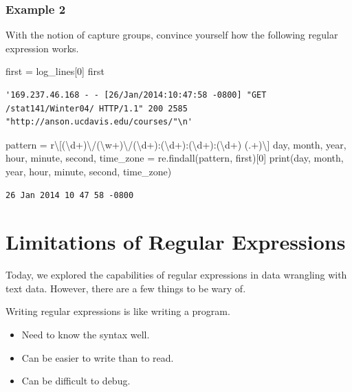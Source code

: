 \documentclass[
  letterpaper,
  DIV=11,
  numbers=noendperiod]{scrreprt}
\newenvironment{Shaded}{\begin{snugshade}}{\end{snugshade}}
\newcommand{\BuiltInTok}[1]{\textcolor[rgb]{0.00,0.23,0.31}{#1}}
\newcommand{\DecValTok}[1]{\textcolor[rgb]{0.68,0.00,0.00}{#1}}
\newcommand{\NormalTok}[1]{\textcolor[rgb]{0.00,0.23,0.31}{#1}}
\newcommand{\OperatorTok}[1]{\textcolor[rgb]{0.37,0.37,0.37}{#1}}
\newcommand{\VerbatimStringTok}[1]{\textcolor[rgb]{0.13,0.47,0.30}{#1}}
\providecommand{\tightlist}{%
  \setlength{\itemsep}{0pt}\setlength{\parskip}{0pt}}\usepackage{longtable,booktabs,array}
\begin{document}
\subsubsection{Example 2}\label{example-2}

With the notion of capture groups, convince yourself how the following
regular expression works.

\begin{Shaded}
\begin{Highlighting}[]
\NormalTok{first }\OperatorTok{=}\NormalTok{ log\_lines[}\DecValTok{0}\NormalTok{]}
\NormalTok{first}
\end{Highlighting}
\end{Shaded}

\begin{verbatim}
'169.237.46.168 - - [26/Jan/2014:10:47:58 -0800] "GET /stat141/Winter04/ HTTP/1.1" 200 2585 "http://anson.ucdavis.edu/courses/"\n'
\end{verbatim}

\begin{Shaded}
\begin{Highlighting}[]
\NormalTok{pattern }\OperatorTok{=} \VerbatimStringTok{r\textquotesingle{}\textbackslash{}[(\textbackslash{}d+)\textbackslash{}/(\textbackslash{}w+)\textbackslash{}/(\textbackslash{}d+):(\textbackslash{}d+):(\textbackslash{}d+):(\textbackslash{}d+) (.+)\textbackslash{}]\textquotesingle{}}
\NormalTok{day, month, year, hour, minute, second, time\_zone }\OperatorTok{=}\NormalTok{ re.findall(pattern, first)[}\DecValTok{0}\NormalTok{]}
\BuiltInTok{print}\NormalTok{(day, month, year, hour, minute, second, time\_zone)}
\end{Highlighting}
\end{Shaded}

\begin{verbatim}
26 Jan 2014 10 47 58 -0800
\end{verbatim}

\section{Limitations of Regular
Expressions}\label{limitations-of-regular-expressions}

Today, we explored the capabilities of regular expressions in data
wrangling with text data. However, there are a few things to be wary of.

Writing regular expressions is like writing a program.

\begin{itemize}
\tightlist
\item
  Need to know the syntax well.
\item
  Can be easier to write than to read.
\item
  Can be difficult to debug.
\end{itemize}
\end{document}
